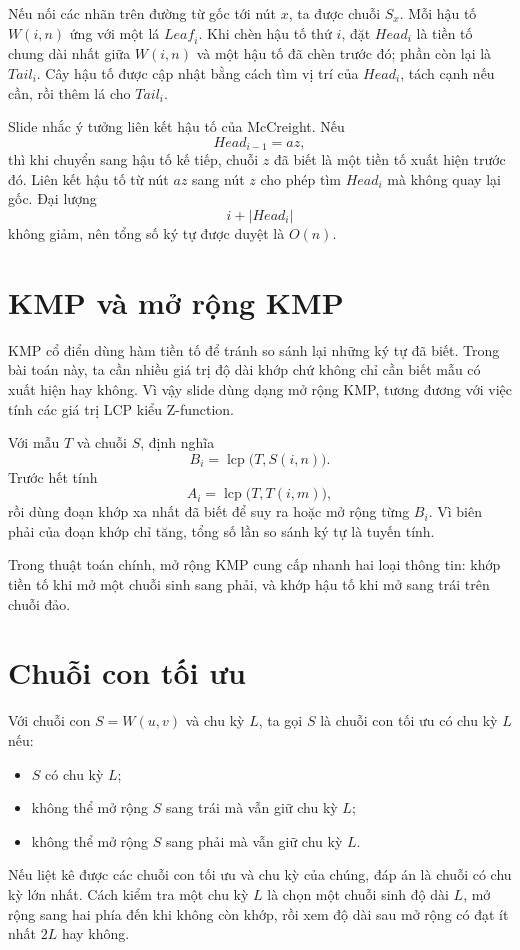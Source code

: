\documentclass[11pt]{article}
\begin{document}
Nếu nối các nhãn trên đường từ gốc tới nút \(x\), ta được chuỗi \(S_x\). Mỗi
hậu tố \(W(i,n)\) ứng với một lá \(\mathit{Leaf}_i\). Khi chèn hậu tố thứ
\(i\), đặt \(\mathit{Head}_i\) là tiền tố chung dài nhất giữa \(W(i,n)\) và
một hậu tố đã chèn trước đó; phần còn lại là \(\mathit{Tail}_i\). Cây hậu tố
được cập nhật bằng cách tìm vị trí của \(\mathit{Head}_i\), tách cạnh nếu cần,
rồi thêm lá cho \(\mathit{Tail}_i\).

Slide nhắc ý tưởng liên kết hậu tố của McCreight. Nếu
\[
  \mathit{Head}_{i-1}=az,
\]
thì khi chuyển sang hậu tố kế tiếp, chuỗi \(z\) đã biết là một tiền tố xuất
hiện trước đó. Liên kết hậu tố từ nút \(az\) sang nút \(z\) cho phép tìm
\(\mathit{Head}_i\) mà không quay lại gốc. Đại lượng
\[
  i+|\mathit{Head}_i|
\]
không giảm, nên tổng số ký tự được duyệt là \(O(n)\).

\section{KMP và mở rộng KMP}

KMP cổ điển dùng hàm tiền tố để tránh so sánh lại những ký tự đã biết. Trong
bài toán này, ta cần nhiều giá trị độ dài khớp chứ không chỉ cần biết mẫu có
xuất hiện hay không. Vì vậy slide dùng dạng mở rộng KMP, tương đương với
việc tính các giá trị LCP kiểu Z-function.

Với mẫu \(T\) và chuỗi \(S\), định nghĩa
\[
  B_i=\operatorname{lcp}\bigl(T,S(i,n)\bigr).
\]
Trước hết tính
\[
  A_i=\operatorname{lcp}\bigl(T,T(i,m)\bigr),
\]
rồi dùng đoạn khớp xa nhất đã biết để suy ra hoặc mở rộng từng \(B_i\). Vì
biên phải của đoạn khớp chỉ tăng, tổng số lần so sánh ký tự là tuyến tính.

Trong thuật toán chính, mở rộng KMP cung cấp nhanh hai loại thông tin:
khớp tiền tố khi mở một chuỗi sinh sang phải, và khớp hậu tố khi mở sang trái
trên chuỗi đảo.

\section{Chuỗi con tối ưu}

Với chuỗi con \(S=W(u,v)\) và chu kỳ \(L\), ta gọi \(S\) là chuỗi con tối ưu
có chu kỳ \(L\) nếu:
\begin{itemize}
  \item \(S\) có chu kỳ \(L\);
  \item không thể mở rộng \(S\) sang trái mà vẫn giữ chu kỳ \(L\);
  \item không thể mở rộng \(S\) sang phải mà vẫn giữ chu kỳ \(L\).
\end{itemize}
Nếu liệt kê được các chuỗi con tối ưu và chu kỳ của chúng, đáp án là chuỗi
có chu kỳ lớn nhất. Cách kiểm tra một chu kỳ \(L\) là chọn một chuỗi sinh độ
dài \(L\), mở rộng sang hai phía đến khi không còn khớp, rồi xem độ dài sau
mở rộng có đạt ít nhất \(2L\) hay không.
\end{document}
